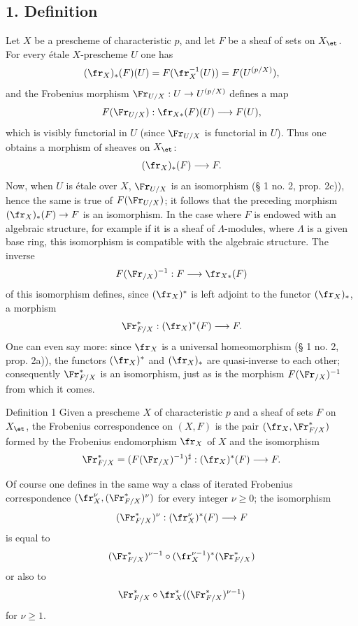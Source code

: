 \subsection*{1. Definition}

Let $X$ be a prescheme of characteristic $p$, and let $F$ be a sheaf of sets on $X_{\et}$. For every étale $X$-prescheme $U$ one has
\[
(\fr_X)_*(F)(U)=F(\fr_X^{-1}(U))=F(U^{(p/X)}),
\]
and the Frobenius morphism $\Fr_{U/X}:U\to U^{(p/X)}$ defines a map
\[
F(\Fr_{U/X}):\fr_{X*}(F)(U)\longrightarrow F(U),
\]
which is visibly functorial in $U$ (since $\Fr_{U/X}$ is functorial in $U$). Thus one obtains a morphism of sheaves on $X_{\et}$:
\[
(\fr_X)_*(F)\longrightarrow F.
\]
Now, when $U$ is étale over $X$, $\Fr_{U/X}$ is an isomorphism (§ 1 no. 2, prop. 2c)), hence the same is true of $F(\Fr_{U/X})$; it follows that the preceding morphism $(\fr_X)_*(F)\to F$ is an isomorphism. In the case where $F$ is endowed with an algebraic structure, for example if it is a sheaf of $\Lambda$-modules, where $\Lambda$ is a given base ring, this isomorphism is compatible with the algebraic structure. The inverse
\[
F(\Fr_{/X})^{-1}:F\longrightarrow \fr_{X*}(F)
\]
of this isomorphism defines, since $(\fr_X)^*$ is left adjoint to the functor $(\fr_X)_*$, a morphism
\[
\Fr^*_{F/X}:(\fr_X)^*(F)\longrightarrow F.
\]
One can even say more: since $\fr_X$ is a universal homeomorphism (§ 1 no. 2, prop. 2a)), the functors $(\fr_X)^*$ and $(\fr_X)_*$ are quasi-inverse to each other; consequently $\Fr^*_{F/X}$ is an isomorphism, just as is the morphism $F(\Fr_{/X})^{-1}$ from which it comes.

\begin{statement}{Definition 1}
Given a prescheme $X$ of characteristic $p$ and a sheaf of sets $F$ on $X_{\et}$, the Frobenius correspondence on $(X,F)$ is the pair $(\fr_X,\Fr^*_{F/X})$ formed by the Frobenius endomorphism $\fr_X$ of $X$ and the isomorphism
\[
\Fr^*_{F/X}=(F(\Fr_{/X})^{-1})^\sharp:(\fr_X)^*(F)\longrightarrow F.
\]
\end{statement}

Of course one defines in the same way a class of iterated Frobenius correspondence $(\fr_X^\nu,(\Fr^*_{F/X})^\nu)$ for every integer $\nu\geq0$; the isomorphism
\[
(\Fr^*_{F/X})^\nu:(\fr_X^\nu)^*(F)\longrightarrow F
\]
is equal to
\[
(\Fr^*_{F/X})^{\nu-1}\circ (\fr_X^{\nu-1})^*(\Fr^*_{F/X})
\]
or also to
\[
\Fr^*_{F/X}\circ\fr_X^*((\Fr^*_{F/X})^{\nu-1})
\]
for $\nu\geq1$.

